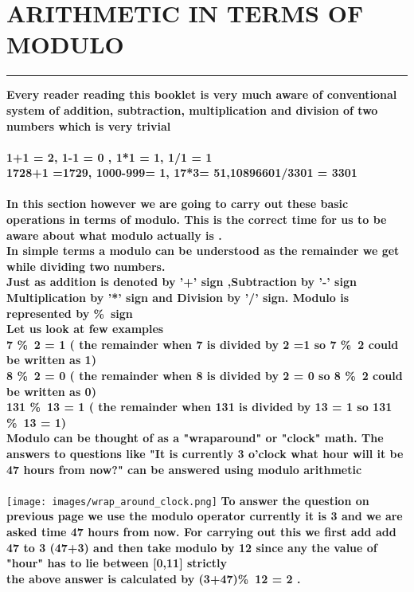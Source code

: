 \documentclass{article}
\begin{document}
\section * {ARITHMETIC IN TERMS OF MODULO }
\hrule
\bigskip
\textbf{Every reader reading this booklet is very much aware of conventional system of addition, subtraction, multiplication and division of two numbers which is very trivial
\\
\\1+1 = 2, 1-1 = 0 , 1*1 = 1,  1/1 = 1
\\1728+1 =1729, 1000-999= 1, 17*3= 51,10896601/3301 = 3301
}
\\ 
\\
\textbf{In this section however we are going to carry out these basic operations in terms of modulo. This is the correct time for us to be aware about what modulo actually is .
\\In simple terms a modulo can be understood as  the remainder we get while dividing two numbers. 
\\
Just as  addition is denoted  by '+' sign ,Subtraction by '-' sign Multiplication by '*' sign and Division by '/' sign. Modulo is represented by \%\ sign
\\ Let us look at few examples 
\\ 7 \%\ 2 = 1 ( the remainder when 7 is divided by 2 =1 so 7 \%\ 2 could be written as 1)
\\ 8 \%\ 2 = 0 ( the remainder when 8 is divided by 2 = 0 so 8 \%\ 2 could be written as 0)
\\ 131 \%\ 13 = 1 ( the remainder when 131 is divided by 13 = 1 so 131 \%\ 13 = 1)
\\
Modulo can be thought of as a "wraparound" or "clock" math. The answers to questions like "It is currently 3 o'clock what hour will it be 47 hours from now?" can be answered using modulo arithmetic}
\\
\\

\texttt{[image: images/wrap\_around\_clock.png]}
\textbf{To answer the question on previous page we use the modulo operator 
currently it is 3 and we are asked time 47 hours from now. For carrying out this we first add add 47 to 3 (47+3) and then take modulo by 12 since any the value of "hour" has to lie between [0,11] strictly \\
the above  answer  is calculated by (3+47)\%\ 12 = 2 . }
\end{document}
